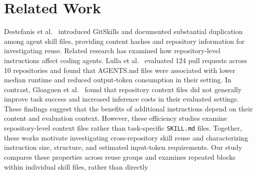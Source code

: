 \documentclass[sigconf,review]{acmart}
\begin{document}
\section{Related Work}
\label{Section:Relatedwork}
Destefanis et al.~\cite{destefanis2026gitskills} introduced
GitSkills and documented substantial duplication among agent
skill files, providing content hashes and repository information
for investigating reuse. Related research has examined how
repository-level instructions affect coding agents. Lulla
et al.~\cite{lulla2026agents} evaluated 124 pull requests across
10 repositories and found that AGENTS.md files were associated
with lower median runtime and reduced output-token consumption
in their setting. In contrast, Gloaguen
et al.~\cite{gloaguen2026agents} found that repository context
files did not generally improve task success and increased
inference costs in their evaluated settings. These findings
suggest that the benefits of additional instructions depend
on their content and evaluation context. However, these
efficiency studies examine repository-level context files
rather than task-specific \texttt{SKILL.md} files. Together, these works motivate investigating cross-repository
skill reuse and characterizing instruction size, structure,
and estimated input-token requirements. Our study compares
these properties across reuse groups and examines repeated
blocks within individual skill files, rather than directly
\end{document}
